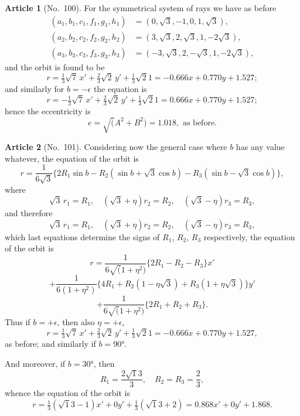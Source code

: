 \documentclass[11pt,a4paper]{article}
\theoremstyle{definition}
\newtheorem{art}{Article}
\begin{document}
\begin{art}[No.~100]
For the symmetrical system of rays we have as before
\begin{align*}
(a_1, b_1, c_1, f_1, g_1, h_1) &= (0, \surd 3, -1, 0, 1, \surd 3),\\
(a_2, b_2, c_2, f_2, g_2, h_2) &= (3, \surd 3, 2, \surd 3, 1, -2\surd 3),\\
(a_3, b_3, c_3, f_3, g_3, h_3) &= (-3, \surd 3, 2, -\surd 3, 1, -2\surd 3),
\end{align*}
and the orbit is found to be
\[
r = \tfrac{1}{3}\surd 7\, x' + \tfrac{2}{3}\surd 2\, y' + \tfrac{1}{3}\surd 21 = -0.666x + 0.770y + 1.527;
\]
and similarly for $b = -\epsilon$ the equation is
\[
r = -\tfrac{1}{3}\surd 7\, x' + \tfrac{2}{3}\surd 2\, y' + \tfrac{1}{3}\surd 21 = 0.666x + 0.770y + 1.527;
\]
hence the eccentricity is
\[
e = \surd(A^2 + B^2) = 1.018, \text{ as before}.
\]
\end{art}

\begin{art}[No.~101]
Considering now the general case where $b$ has any value whatever, the equation of the orbit is
\[
r = \frac{1}{6\surd 3}\{2R_1\sin b - R_2(\sin b + \surd 3\cos b) - R_3(\sin b - \surd 3\cos b)\},
\]
where
\[
\surd 3\, r_1 = R_1, \quad (\surd 3 + \eta)r_2 = R_2, \quad (\surd 3 - \eta)r_3 = R_3,
\]
and therefore
\[
\surd 3\, r_1 = R_1, \quad (\surd 3 + \eta)r_2 = R_2, \quad (\surd 3 - \eta)r_3 = R_3,
\]
which last equations determine the signs of $R_1$, $R_2$, $R_3$ respectively, the equation of the orbit is
\[
r = \frac{1}{6\surd(1 + \eta^2)}\{2R_1 - R_2 - R_3\}x'
\]
\[
+ \frac{1}{6(1 + \eta^2)}\{4R_1 + R_2(1 - \eta\surd 3) + R_3(1 + \eta\surd 3)\}y'
\]
\[
+ \frac{1}{6\surd(1 + \eta^2)}\{2R_1 + R_2 + R_3\}.
\]
Thus if $b = +\epsilon$, then also $\eta = +\epsilon$,
\[
r = \tfrac{1}{3}\surd 7\, x' + \tfrac{2}{3}\surd 2\, y' + \tfrac{1}{3}\surd 21 = -0.666x + 0.770y + 1.527,
\]
as before; and similarly if $b = 90°$.

And moreover, if $b = 30°$, then
\[
R_1 = \frac{2\surd 13}{3}, \quad R_2 = R_3 = \frac{2}{3},
\]
whence the equation of the orbit is
\[
r = \tfrac{1}{3}(\surd 13 - 1)x' + 0y' + \tfrac{1}{3}(\surd 13 + 2) = 0.868x' + 0y' + 1.868.
\]
\end{art}
\end{document}

